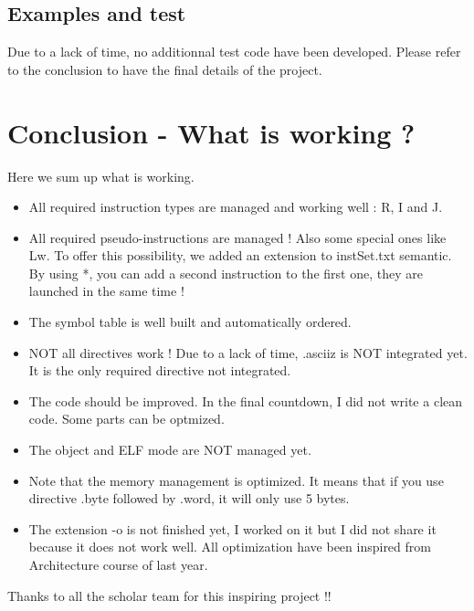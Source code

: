 \documentclass[twoside,twocolumn]{article}
\begin{document}
\subsection{Examples and test}

Due to a lack of time, no additionnal test code have been developed. Please refer to the conclusion to have the final details of the project.


\section{Conclusion - What is working ?}

Here we sum up what is working.

\begin{itemize}
 \item All required instruction types are managed and working well : R, I and J.
 \item All required pseudo-instructions are managed ! Also some special ones like Lw. To offer this possibility, we added an extension to instSet.txt semantic. By using *, you can add a second instruction to the first one, they are launched in the same time !
 \item The symbol table is well built and automatically ordered.
 \item NOT all directives work ! Due to a lack of time, .asciiz is NOT integrated yet. It is the only required directive not integrated.
 \item The code should be improved. In the final countdown, I did not write a clean code. Some parts can be optmized.
 \item The object and ELF mode are NOT managed yet.
 \item Note that the memory management is optimized. It means that if you use directive .byte followed by .word, it will only use 5 bytes.
 \item The extension -o is not finished yet, I worked on it but I did not share it because it does not work well. All optimization have been inspired from Architecture course of last year.
\end{itemize}

Thanks to all the scholar team for this inspiring project !!

\end{document}
